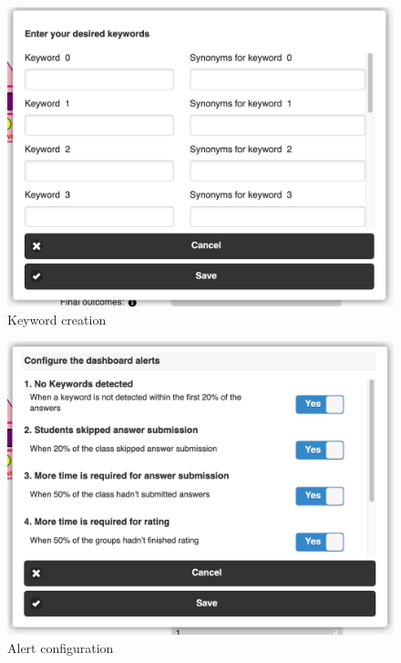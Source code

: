 \begin{figure}[!h]
    \includegraphics[clip,width=\columnwidth]{Figures/pyramidapp4.png}%
\caption{Keyword creation}
\label{fig:P4}
\end{figure}
\begin{figure}[!h]
    \includegraphics[clip,width=\columnwidth]{Figures/pyramidapp5.png}%
\caption{Alert configuration}
\label{fig:P5}
\end{figure}
